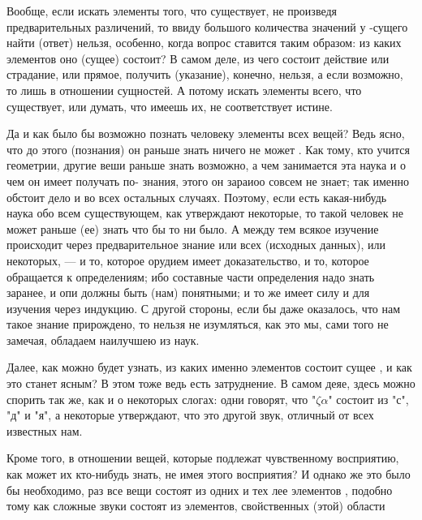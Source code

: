 \documentclass{article}
\begin{document}
Вообще, если искать элементы того, что существует, не произведя предварительных различений, то ввиду большого количества значений у -сущего найти (ответ) нельзя, особенно, когда вопрос ставится таким образом: из каких элементов оно (сущее) состоит? В самом деле, из чего состоит действие или страдание, или прямое, получить (указание), конечно, нельзя, а если возможно, то лишь в отношении сущностей.  А потому искать элементы всего, что существует, или думать, что имеешь их, не соответствует истине.

Да и как было бы возможно познать человеку элементы всех вещей? Ведь ясно, что до этого (познания) он раньше знать ничего не может . Как тому, кто учится геометрии, другие веши раньше знать возможно, а чем занимается эта наука и о чем он имеет получать по- знания, этого он зараиоо совсем не знает; так именно обстоит дело и во всех остальных случаях. Поэтому, если есть какая-нибудь наука обо всем существующем, как утверждают некоторые,
\footnotemark[40]
то такой человек не может раньше (ее) знать что бы то ни было. А между тем всякое изучение происходит через предварительное знание или всех (исходных данных), или некоторых, --- и то, которое орудием имеет доказательство, и то, которое обращается к определениям; ибо составные части определения надо знать заранее, и опи должны быть (нам) понятными; и то же имеет силу и для изучения через индукцию.
\footnotemark[41]
С другой стороны, если бы даже оказалось, что нам такое знание прирождено,
\footnotemark[42]
то нельзя не изумляться, как это мы, сами того не замечая, обладаем наилучшею из наук.

Далее, как можно будет узнать, из каких именно элементов состоит сущее , и как это станет ясным? В этом тоже ведь есть затруднение. В самом деяе, здесь можно спорить так же, как и о некоторых слогах: одни говорят, что "$\zeta \alpha$" состоит из "с", "д" и "я", а некоторые утверждают, что это другой звук, отличный от всех известных нам.

Кроме того, в отношении вещей, которые подлежат чувственному восприятию, как может их кто-нибудь знать, не имея этого восприятия? И однако же это было бы необходимо, раз все вещи состоят из одних и тех лее элементов , подобно тому как сложные звуки состоят из элементов, свойственных (этой) области
\footnotemark[44]
\end{document}
